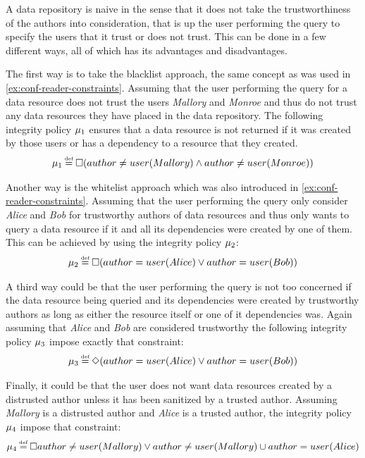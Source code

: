 \begin{example}
A data repository is naive in the sense that it does not take the trustworthiness of the authors into consideration, that is up the user performing the query to specify the users that it trust or does not trust. This can be done in a few different ways, all of which has its advantages and disadvantages.

The first way is to take the blacklist approach, the same concept as was used in \autoref{ex:conf-reader-constraints}. Assuming that the user performing the query for a data resource does not trust the users \emph{Mallory} and \emph{Monroe} and thus do not trust any data resources they have placed in the data repository. The following integrity policy $\mu_1$ ensures that a data resource is not returned if it was created by those users or has a dependency to a resource that they created.
\begin{align*}
    \inte_1 \eqdef \G( author \neq user(Mallory) \land author \neq user(Monroe))
\end{align*}

Another way is the whitelist approach which was also introduced in \autoref{ex:conf-reader-constraints}. Assuming that the user performing the query only consider \emph{Alice} and \emph{Bob} for trustworthy authors of data resources and thus only wants to query a data resource if it and all its dependencies were created by one of them. This can be achieved by using the integrity policy $\mu_2$:
\begin{align*}
    \inte_2 \eqdef \G(author = user(Alice) \lor author = user(Bob))
\end{align*}

A third way could be that the user performing the query is not too concerned if the data resource being queried and its dependencies were created by trustworthy authors as long as either the resource itself or one of it dependencies was. Again assuming that \emph{Alice} and \emph{Bob} are considered trustworthy the following integrity policy $\mu_3$ impose exactly that constraint:
\begin{align*}
    \inte_3 \eqdef \F(author = user(Alice) \lor author = user(Bob))
\end{align*}

Finally, it could be that the user does not want data resources created by a distrusted author unless it has been sanitized by a trusted author. Assuming \emph{Mallory} is a distrusted author and \emph{Alice} is a trusted author, the integrity policy $\mu_4$ impose that constraint:
\begin{align*}
    \inte_4 \eqdef \G author \neq user(Mallory) \lor author \neq user(Mallory) \U author = user(Alice)
\end{align*}
\end{example}